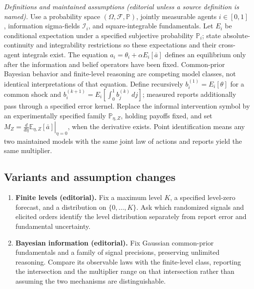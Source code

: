\documentclass[11pt,a4paper]{article}
\begin{document}
\emph{Definitions and maintained assumptions (editorial unless a source definition is named).} Use a probability space \((\Omega,\mathcal F,\mathbb P)\), jointly measurable agents \(i\in[0,1]\), information sigma-fields \(\mathcal I_i\), and square-integrable fundamentals. Let \(E_i\) be conditional expectation under a specified subjective probability \(\mathbb P_i\); state absolute-continuity and integrability restrictions so these expectations and their cross-agent integrals exist. The equation \(a_i=\theta_i+\alpha E_i[\bar a]\) defines an equilibrium only after the information and belief operators have been fixed. Common-prior Bayesian behavior and finite-level reasoning are competing model classes, not identical interpretations of that equation. Define recursively \(b_i^{(1)}=E_i[\theta]\) for a common shock and \(b_i^{(k+1)}=E_i[\int_0^1 b_j^{(k)}\,dj]\); measured reports additionally pass through a specified error kernel. Replace the informal intervention symbol by an experimentally specified family \(\mathbb P_{\eta,Z}\), holding payoffs fixed, and set \(M_Z=\left.\frac{d}{d\eta}\mathbb E_{\eta,Z}[\bar a]\right|_{\eta=0}\), when the derivative exists. Point identification means any two maintained models with the same joint law of actions and reports yield the same multiplier.
\subsection*{Variants and assumption changes}
\begin{enumerate}
\item \textbf{Finite levels (editorial).} Fix a maximum level \(K\), a specified level-zero forecast, and a distribution on \(\{0,\ldots,K\}\). Ask which randomized signals and elicited orders identify the level distribution separately from report error and fundamental uncertainty.
\item \textbf{Bayesian information (editorial).} Fix Gaussian common-prior fundamentals and a family of signal precisions, preserving unlimited reasoning. Compare its observable laws with the finite-level class, reporting the intersection and the multiplier range on that intersection rather than assuming the two mechanisms are distinguishable.
\end{enumerate}
\end{document}
